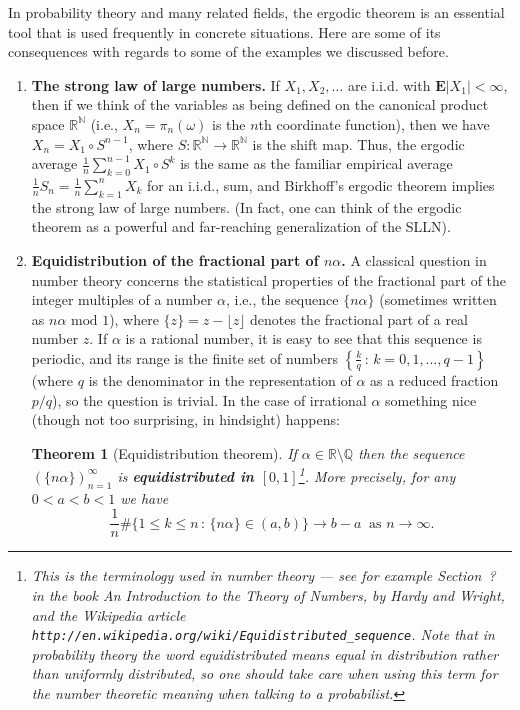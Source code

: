 \documentclass[12pt]{article}
\newtheorem{thm}{Theorem}[section]
\newcommand{\R}{\mathbb{R}}
\newcommand{\N}{\mathbb{N}}
\newcommand{\expec}{\mathbf{E}}
\theoremstyle{example}
\begin{document}
In probability theory and many related fields, the ergodic theorem is an essential tool that is used frequently in concrete situations. Here are some of its consequences with regards to some of the examples we discussed before.

\begin{enumerate}

\item \textbf{The strong law of large numbers.} If $X_1,X_2,\ldots $ are i.i.d. with $\expec|X_1|<\infty$, then if we think of the variables as being defined on the canonical product space $\R^\N$ (i.e., $X_n=\pi_n(\omega)$ is the $n$th coordinate function), then we have $X_n = X_1\circ S^{n-1}$, where $S:\R^\N\to\R^\N$ is the shift map. Thus, the ergodic average $\frac{1}{n} \sum_{k=0}^{n-1} X_1\circ S^k$ is the same as the familiar empirical average $\frac{1}{n} S_n = \frac{1}{n} \sum_{k=1}^n X_k$ for an i.i.d., sum, and Birkhoff's ergodic theorem implies the strong law of large numbers. (In fact, one can think of the ergodic theorem as a powerful and far-reaching generalization of the SLLN).

\item \textbf{Equidistribution of the fractional part of $n\alpha$.} A classical question in number theory concerns the statistical properties of the fractional part of the integer multiples of a number $\alpha$, i.e., the sequence $\{n \alpha \}$ (sometimes written as $n\alpha \textrm{ mod }1$), where $\{z\}=z-\lfloor z\rfloor$ denotes the fractional part of a real number $z$. If $\alpha$ is a rational number, it is easy to see that this sequence is periodic, and its range is the finite set of numbers $\left\{ \frac{k}{q}\,:\, k=0,1,\ldots,q-1 \right\}$ (where $q$ is the denominator in the representation of $\alpha$ as a reduced fraction $p/q$), so the question is trivial. In the case of irrational $\alpha$ something nice (though not too surprising, in hindsight) happens:

\begin{thm}[Equidistribution theorem] \label{thm-equidistribution}
If $\alpha\in \R\setminus\mathbb{Q}$ then the sequence $( \{ n\alpha \} )_{n=1}^\infty$ is \textbf{equidistributed in $[0,1]$}\footnote{This is the terminology used in number theory --- see for example Section~? in the book \textit{An Introduction to the Theory of Numbers}, by Hardy and Wright, and the Wikipedia article
\texttt{http://en.wikipedia.org/wiki/Equidistributed\_sequence}.
Note that in probability theory the word \emph{equidistributed} means equal in distribution rather than uniformly distributed, so one should take care when using this term for the number theoretic meaning when talking to a probabilist.}. More precisely, for any $0<a<b<1$ we have
$$ \frac{1}{n} \# \Big\{ 1\le k\le n\,:\, \{n\alpha\}\in (a,b) \Big\} \to b-a\ \textrm{ as }n\to\infty. $$
\end{thm}


\end{enumerate}
\end{document}
